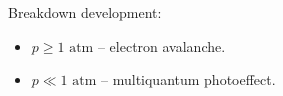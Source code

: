 \documentclass{beamer}
\begin{document}
\begin{frame}
		Breakdown development:
		\begin{itemize}
			\item $p \geqslant 1\text{ atm}$ -- electron avalanche.
			\item $p \ll 1\text{ atm}$ -- multiquantum photoeffect.
		\end{itemize}
	\end{frame}
	
\end{document}
